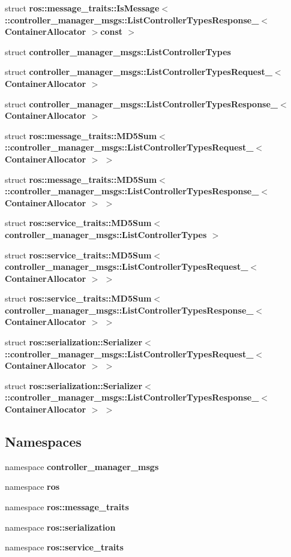 \begin{DoxyCompactItemize}
\item 
struct {\bf ros\-::message\-\_\-traits\-::\-Is\-Message$<$ \-::controller\-\_\-manager\-\_\-msgs\-::\-List\-Controller\-Types\-Response\-\_\-$<$ Container\-Allocator $>$const  $>$}
\item 
struct {\bf controller\-\_\-manager\-\_\-msgs\-::\-List\-Controller\-Types}
\item 
struct {\bf controller\-\_\-manager\-\_\-msgs\-::\-List\-Controller\-Types\-Request\-\_\-$<$ Container\-Allocator $>$}
\item 
struct {\bf controller\-\_\-manager\-\_\-msgs\-::\-List\-Controller\-Types\-Response\-\_\-$<$ Container\-Allocator $>$}
\item 
struct {\bf ros\-::message\-\_\-traits\-::\-M\-D5\-Sum$<$ \-::controller\-\_\-manager\-\_\-msgs\-::\-List\-Controller\-Types\-Request\-\_\-$<$ Container\-Allocator $>$ $>$}
\item 
struct {\bf ros\-::message\-\_\-traits\-::\-M\-D5\-Sum$<$ \-::controller\-\_\-manager\-\_\-msgs\-::\-List\-Controller\-Types\-Response\-\_\-$<$ Container\-Allocator $>$ $>$}
\item 
struct {\bf ros\-::service\-\_\-traits\-::\-M\-D5\-Sum$<$ controller\-\_\-manager\-\_\-msgs\-::\-List\-Controller\-Types $>$}
\item 
struct {\bf ros\-::service\-\_\-traits\-::\-M\-D5\-Sum$<$ controller\-\_\-manager\-\_\-msgs\-::\-List\-Controller\-Types\-Request\-\_\-$<$ Container\-Allocator $>$ $>$}
\item 
struct {\bf ros\-::service\-\_\-traits\-::\-M\-D5\-Sum$<$ controller\-\_\-manager\-\_\-msgs\-::\-List\-Controller\-Types\-Response\-\_\-$<$ Container\-Allocator $>$ $>$}
\item 
struct {\bf ros\-::serialization\-::\-Serializer$<$ \-::controller\-\_\-manager\-\_\-msgs\-::\-List\-Controller\-Types\-Request\-\_\-$<$ Container\-Allocator $>$ $>$}
\item 
struct {\bf ros\-::serialization\-::\-Serializer$<$ \-::controller\-\_\-manager\-\_\-msgs\-::\-List\-Controller\-Types\-Response\-\_\-$<$ Container\-Allocator $>$ $>$}
\end{DoxyCompactItemize}
\subsection*{\-Namespaces}
\begin{DoxyCompactItemize}
\item 
namespace {\bf controller\-\_\-manager\-\_\-msgs}
\item 
namespace {\bf ros}
\item 
namespace {\bf ros\-::message\-\_\-traits}
\item 
namespace {\bf ros\-::serialization}
\item 
namespace {\bf ros\-::service\-\_\-traits}
\end{DoxyCompactItemize}
